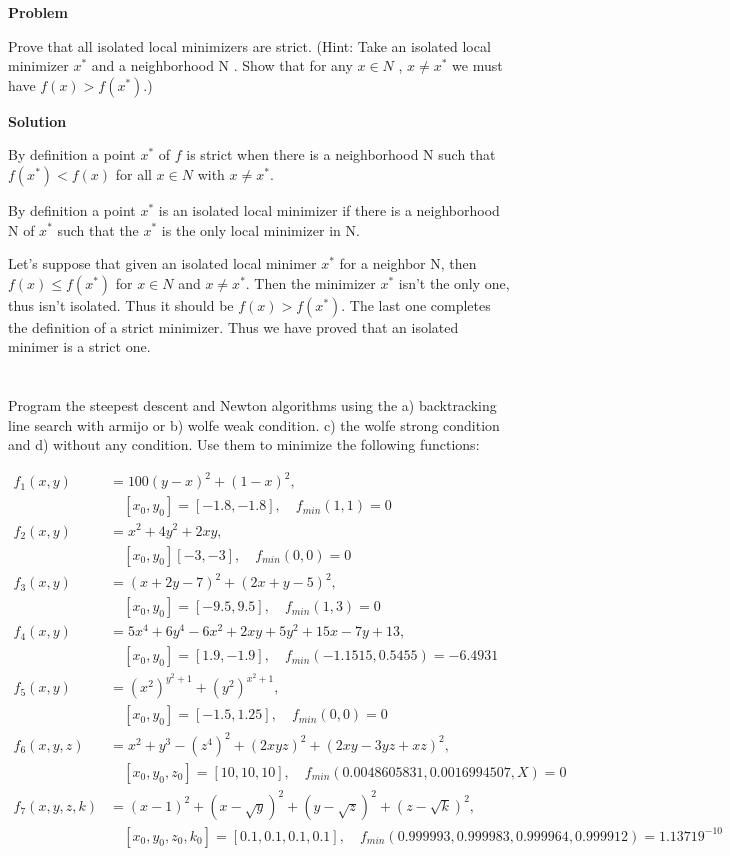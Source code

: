 \documentclass[a4paper,11pt]{article}
\numberwithin{equation}{section} %
\begin{document}
\textbf{Problem}

Prove that all isolated local minimizers are strict. (Hint: Take an isolated local
minimizer $x^{*}$ and a neighborhood N . Show that for any $x \in N$ , $x \neq x^{*}$ we must have $f(x) > f(x^{*})$.)

\textbf{Solution}

By definition a point $x^{*}$ of $f$ is strict when there is a neighborhood N such that $f(x^{*}) < f(x)$ for all $x \in N$ with $x \neq x^{*}$.

By definition a point $x^{*}$ is an isolated local minimizer if there is a neighborhood N of $x^{*}$ such that the $x^{*}$ is the only local minimizer in N.

Let's suppose that given an isolated local minimer $x^{*}$ for a neighbor N, then $f(x) \leq f(x^{*})$ for $x \in N$ and $x \neq x^{*}$. Then the minimizer $x^{*}$ isn't the only one, thus isn't isolated. Thus it should be $f(x) > f(x^{*})$. The last one completes the definition of a strict minimizer. Thus we have proved that an isolated minimer is a strict one.

\pagebreak


\section{}

Program the steepest descent and Newton algorithms using the a) backtracking line search with armijo or b) wolfe weak condition. c) the wolfe strong condition and d) without any condition. Use them to minimize the following functions:

\begin{align*}
    f_1(x,y) &= 100 (y-x)^2 + (1-x)^2, \\ &\quad [x_0,y_0] = [-1.8,-1.8], \quad f_{min}(1,1)=0  \\
    f_2(x,y) &= x^2 + 4y^2 + 2xy, \\ & \quad [x_0,y_0] [-3,-3], \quad f_{min}(0,0) = 0 \\
    f_3(x,y) &= (x+2y-7)^2 + (2x+y-5)^2, \\ & \quad [x_0,y_0] = [-9.5,9.5], \quad f_{min}(1,3) = 0 \\
    f_4(x,y) &= 5x^4 + 6y^4 - 6x^2 + 2xy + 5y^2 + 15x -7y + 13, \\ & \quad [x_0,y_0] = [1.9,-1.9], \quad f_{min}(-1.1515,0.5455) = -6.4931 \\
    f_5(x,y) &= (x^2)^{y^2+1} + (y^2)^{x^2+1},\\ & \quad [x_0,y_0] = [-1.5,1.25], \quad f_{min}(0,0) = 0 \\
    f_6(x,y,z) &= x^2 + y^3 - (z^4)^2 + (2xyz)^2 + (2xy-3yz+xz)^2, \\ & \quad [x_0,y_0,z_0] = [10,10,10], \quad f_{min}(0.0048605831,0.0016994507,X) = 0 \\
    f_7(x,y,z,k) &= (x-1)^2 + (x-\sqrt{y})^2 + (y-\sqrt{z})^2 + (z-\sqrt{k})^2, \\ & \quad [x_0,y_0,z_0,k_0] = [0.1,0.1,0.1,0.1], \quad f_{min}(0.999993,0.999983,0.999964,0.999912) = 1.13719^{-10} \\
\end{align*}
\end{document}
